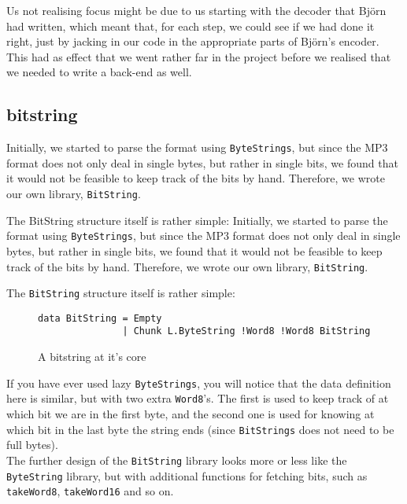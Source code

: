 \documentclass[a4paper,12pt]{article}
\begin{document}
        Us not realising focus might be due to us starting with the decoder that
        Björn had written, which meant that, for each step, we could see if we
        had done it right, just by jacking in our code in the appropriate parts
        of Björn's encoder. This had as effect that we went rather far in the
        project before we realised that we needed to write a back-end as well.

    \subsection{bitstring}
    \label{sec:bitstring}
        Initially, we started to parse the format using \texttt{ByteStrings},
        but since the MP3 format does not only deal in single bytes, but rather
        in single bits, we found that it would not be feasible to keep track of
        the bits by hand. Therefore, we wrote our own library,
        \texttt{BitString}.

        The BitString structure itself is rather simple:
        Initially, we started to parse the format using \texttt{ByteStrings},
        but since the MP3 format does not only deal in single bytes, but rather
        in single bits, we found that it would not be feasible to keep track of
        the bits by hand. Therefore, we wrote our own library,
        \texttt{BitString}.

        The \texttt{BitString} structure itself is rather simple:
\begin{figure}[H]
  \begin{center}
        \begin{lstlisting}
data BitString = Empty
               | Chunk L.ByteString !Word8 !Word8 BitString
        \end{lstlisting}
    \caption{A bitstring at it's core}\label{fig:bitstring}
  \end{center}
\end{figure}

        If you have ever used lazy \texttt{ByteStrings}, you will notice that
        the data definition here is similar, but with two extra
        \texttt{Word8}'s. The first is used to keep track of at which bit we are
        in the first byte, and the second one is used for knowing at which bit
        in the last byte the string ends (since \texttt{BitStrings} does not
        need to be full bytes). \\ The further design of the \texttt{BitString}
        library looks more or less like the \texttt{ByteString} library, but
        with additional functions for fetching bits, such as \texttt{takeWord8},
        \texttt{takeWord16} and so on. \\
\end{document}
